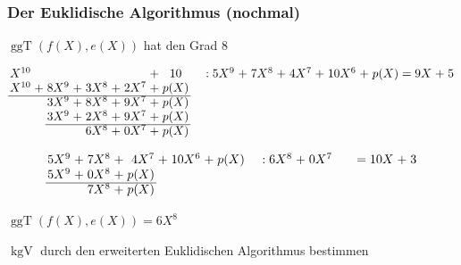 \documentclass[11pt,aspectratio=169]{beamer}
\begin{document}
	\begin{frame}
		\frametitle{Der Euklidische Algorithmus (nochmal)}
		
		$\operatorname{ggT}(f(X),e(X))$ hat den Grad $8$
		
		\[
		\arraycolsep=1.4pt
		\begin{array}{rcrcrcrcccrcrcrcrcrcrcrcrcr}
			X^{10}& & & & & & &+& 10& & & & &:&5X^9&+&7X^8&+& 4X^7&+&10X^6&+&p(X)&=&9X&+&5\\
			X^{10}&+& 8X^9&+& 3X^8&+&2X^7&+& p(X)& &  & & & &   & & & & & &   & &  & & \\ \cline{1-9}
			&& 3X^9&+& 8X^8&+& 9X^7&+& p(X)& &   & & & & & &   & &  & & \\
			&& 3X^9&+& 2X^8&+& 9X^7&+& p(X)& &   & & & & & &   & &  & & \\ \cline{3-9}
			& &    & &6X^8&+&0X^7&+&p(X)& &   & & & & & &   & &  & & \\
		\end{array}
		\]

		\[
		\arraycolsep=1.4pt
		\begin{array}{rcrcrcrcccrcrcrcrcrcrcrcrcr}
			5X^9&+& 7X^8&+& 4X^7&+& 10X^6&+& p(X)& & & & &:&6X^8&+&0X^7& & & & & & &=&10X&+&3\\
			5X^9&+& 0X^8&+& p(X)& & & & & &  & & & &   & & & & & &   & &  & & \\ \cline{1-5}
			&& 7X^8&+& p(X)& & & & & &   & & & & & &   & &  & & \\
		\end{array}
		\]
		
		\vspace{10pt}
		
		$\operatorname{ggT}(f(X),e(X)) = 6X^8$
		
		\vspace{10pt}
		
		$\operatorname{kgV}$ durch den erweiterten Euklidischen Algorithmus bestimmen
		
	\end{frame}
		
\end{document}

